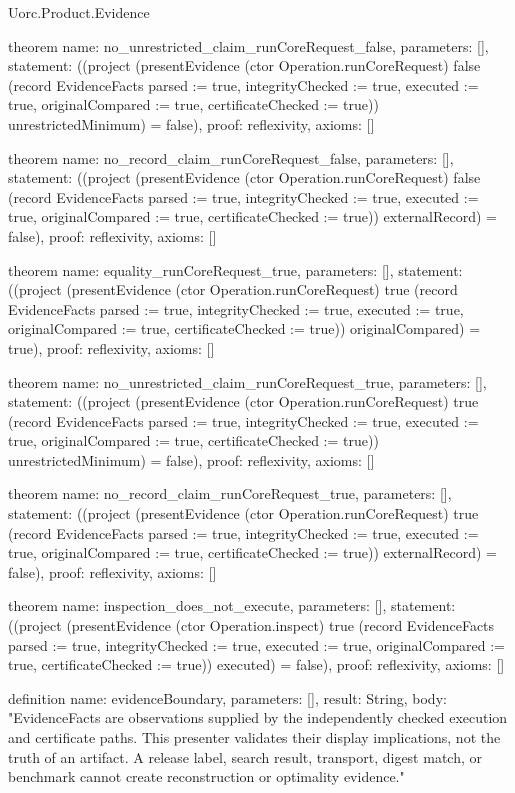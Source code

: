 \begin{lexlean}{Uorc.Product.Evidence}
\begin{semanticmodule}
theorem{
  name: no_unrestricted_claim_runCoreRequest_false,
  parameters: [],
  statement: ((project (presentEvidence (ctor Operation.runCoreRequest) false (record EvidenceFacts {parsed := true, integrityChecked := true, executed := true, originalCompared := true, certificateChecked := true})) unrestrictedMinimum) = false),
  proof: reflexivity{},
  axioms: []
}

theorem{
  name: no_record_claim_runCoreRequest_false,
  parameters: [],
  statement: ((project (presentEvidence (ctor Operation.runCoreRequest) false (record EvidenceFacts {parsed := true, integrityChecked := true, executed := true, originalCompared := true, certificateChecked := true})) externalRecord) = false),
  proof: reflexivity{},
  axioms: []
}

theorem{
  name: equality_runCoreRequest_true,
  parameters: [],
  statement: ((project (presentEvidence (ctor Operation.runCoreRequest) true (record EvidenceFacts {parsed := true, integrityChecked := true, executed := true, originalCompared := true, certificateChecked := true})) originalCompared) = true),
  proof: reflexivity{},
  axioms: []
}

theorem{
  name: no_unrestricted_claim_runCoreRequest_true,
  parameters: [],
  statement: ((project (presentEvidence (ctor Operation.runCoreRequest) true (record EvidenceFacts {parsed := true, integrityChecked := true, executed := true, originalCompared := true, certificateChecked := true})) unrestrictedMinimum) = false),
  proof: reflexivity{},
  axioms: []
}

theorem{
  name: no_record_claim_runCoreRequest_true,
  parameters: [],
  statement: ((project (presentEvidence (ctor Operation.runCoreRequest) true (record EvidenceFacts {parsed := true, integrityChecked := true, executed := true, originalCompared := true, certificateChecked := true})) externalRecord) = false),
  proof: reflexivity{},
  axioms: []
}

theorem{
  name: inspection_does_not_execute,
  parameters: [],
  statement: ((project (presentEvidence (ctor Operation.inspect) true (record EvidenceFacts {parsed := true, integrityChecked := true, executed := true, originalCompared := true, certificateChecked := true})) executed) = false),
  proof: reflexivity{},
  axioms: []
}

definition{
  name: evidenceBoundary,
  parameters: [],
  result: String,
  body: "EvidenceFacts are observations supplied by the independently checked execution and certificate paths. This presenter validates their display implications, not the truth of an artifact. A release label, search result, transport, digest match, or benchmark cannot create reconstruction or optimality evidence."
}


\end{semanticmodule}
\end{lexlean}
